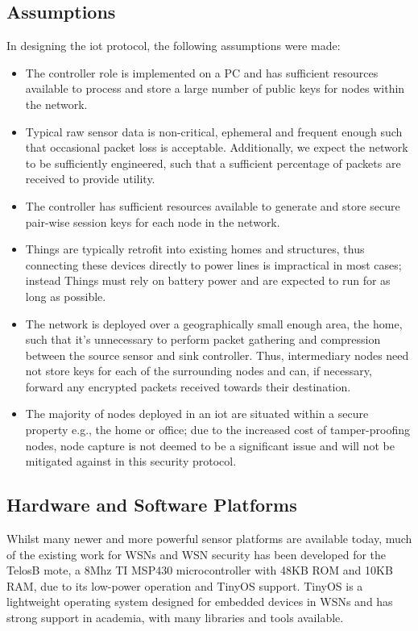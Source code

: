\documentclass[conference]{./sty/IEEEtran}
\begin{document}
\subsection{Assumptions} %
\label{sub:assumptions}
In designing the iot protocol, the following assumptions were made:
\begin{itemize}
  \item The controller role is implemented on a PC and has sufficient resources available to process and store a large number of public keys for nodes within the network.
  \item Typical raw sensor data is non-critical, ephemeral and frequent enough such that occasional packet loss is acceptable. Additionally, we expect the network to be sufficiently engineered, such that a sufficient percentage of packets are received to provide utility.
  \item The controller has sufficient resources available to generate and store secure pair-wise session keys for each node in the network.
  \item Things are typically retrofit into existing homes and structures, thus connecting these devices directly to power lines is impractical in most cases; instead Things must rely on battery power and are expected to run for as long as possible.  
  \item The network is deployed over a geographically small enough area, the home, such that it's unnecessary to perform packet gathering and compression between the source sensor and sink controller. Thus, intermediary nodes need not store keys for each of the surrounding nodes and can, if necessary, forward any encrypted packets received towards their destination.
  \item The majority of nodes deployed in an iot are situated within a secure property e.g., the home or office; due to the increased cost of tamper-proofing nodes, node capture is not deemed to be a significant issue and will not be mitigated against in this security protocol.
\end{itemize}

\subsection{Hardware and Software Platforms} %
\label{sec:hardware_and_software_platforms}
Whilst many newer and more powerful sensor platforms are available today, much of the existing work for WSNs and WSN security has been developed for the TelosB mote, a 8Mhz TI MSP430 microcontroller with 48KB ROM and 10KB RAM, due to its low-power operation and TinyOS support. TinyOS is a lightweight operating system designed for embedded devices in WSNs and has strong support in academia, with many libraries and tools available. 
\end{document}
